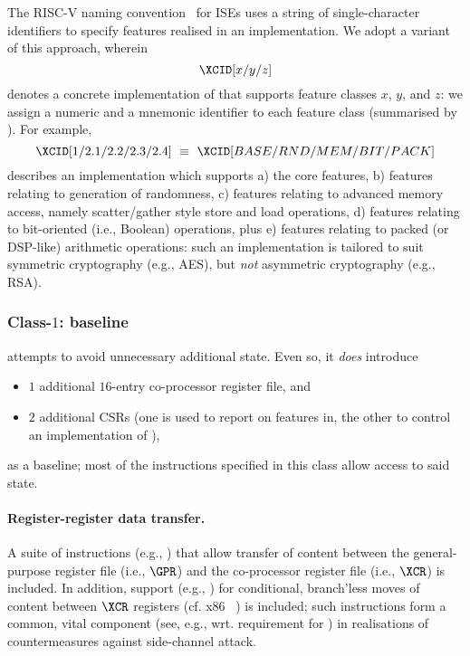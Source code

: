 \noindent
The RISC-V naming convention~\cite[Section 22]{SCARV:RV:ISA:I:17} for ISEs
uses a string of single-character identifiers to specify features realised
in an implementation.  We adopt a variant of this approach, wherein
\[
\XCID[x/y/z]
\]
denotes a concrete implementation of \XCID that supports feature classes 
$x$, $y$, and $z$: we assign a numeric and a mnemonic identifier to each
feature class (summarised by ).  For example,
\[
\XCID[1/2.1/2.2/2.3/2.4] ~\equiv~ \XCID[BASE/RND/MEM/BIT/PACK]
\]
describes an implementation which supports
a) the core features,
b) features relating to generation of randomness,
c) features relating to advanced memory access, namely scatter/gather
   style store and load operations,
d) features relating to bit-oriented (i.e., Boolean) operations,
   plus
e) features relating to packed (or DSP-like) arithmetic operations:
such an implementation is tailored to suit symmetric cryptography (e.g.,
AES), but {\em not} asymmetric cryptography (e.g., RSA).


\subsubsection{Class-$1$:   baseline}
\label{sec:bg:feature:1}

\XCID attempts to avoid unnecessary additional state.  Even so, it {\em does}
introduce

\begin{itemize}
\item $1$ additional $16$-entry co-processor register file,
      and
\item $2$ additional CSRs 
      (one is used to report on features in, the other to control an implementation of \XCID),
\end{itemize}

\noindent
as a baseline; most of the instructions specified in this class allow access 
to said state.

\paragraph{Register-register data transfer.}

A suite of instructions
(e.g., )
that allow 
transfer of content between
the general-purpose register file (i.e., $\GPR$)
and
the    co-processor register file (i.e., $\XCR$)
is included.
In addition, support 
(e.g., )
for conditional, branch'less moves of content between $\XCR$ registers 
(cf. x86 ~\cite[Page 3-149--3-152]{SCARV:X86:2:18})
is included; such instructions form a common, vital component
(see, e.g., \cite[Section 5]{SCARV:RFC:7748} wrt. requirement for )
in realisations of countermeasures against side-channel attack.

